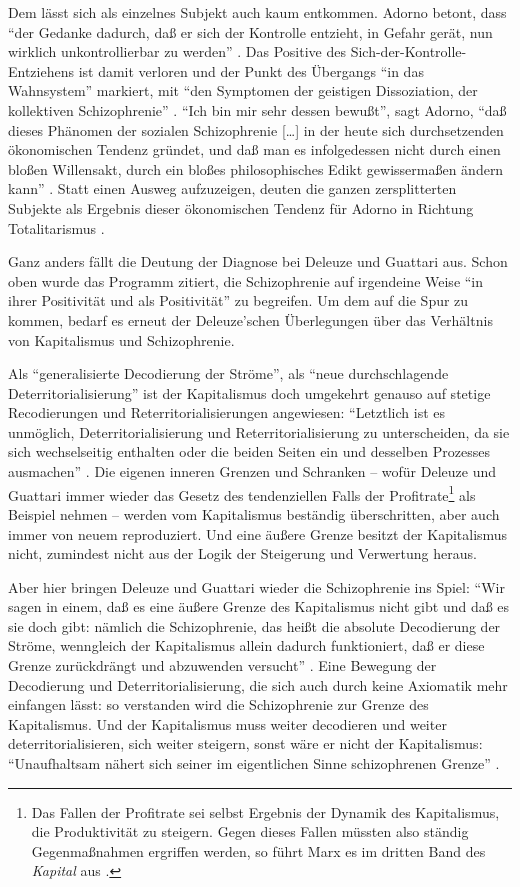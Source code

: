 \documentclass[12pt,
               paper=a4,
               twoside=false,
               onehalfspacing,
               bibliography=totoc,
               toc=graduated,
               ]{scrartcl}
\newcommand{\lips}{\dots\unkern}
\newcommand{\pc}[2]{\parencite[#1]{#2}}
\newcommand{\vgl}[2]{\parencite[vgl.][#1]{#2}}
\newcommand{\dg}{Deleuze und Guattari\xspace}
\begin{document}
Dem lässt sich als einzelnes Subjekt auch kaum entkommen. Adorno
betont, dass "`der Gedanke dadurch, daß er sich der Kontrolle
entzieht, in Gefahr gerät, nun wirklich unkontrollierbar zu werden"'
\pc{229}{vla}. Das Positive des Sich-der-Kontrolle-Entziehens ist
damit verloren und der Punkt des Übergangs "`in das
Wahnsystem"' \pc{229}{vla} markiert, mit "`den Symptomen der geistigen
Dissoziation, der kollektiven Schizophrenie"' \pc{229}{vla}. "`Ich bin
mir sehr dessen bewußt"', sagt Adorno, "`daß dieses Phänomen der
sozialen Schizophrenie [\lips] in der heute sich durchsetzenden
ökonomischen Tendenz gründet, und daß man es infolgedessen nicht durch
einen bloßen Willensakt, durch ein bloßes philosophisches Edikt
gewissermaßen ändern kann"' \pc{274}{vla}. Statt einen Ausweg
aufzuzeigen, deuten die ganzen zersplitterten Subjekte als Ergebnis
dieser ökonomischen Tendenz für Adorno in Richtung Totalitarismus
\vgl{263}{min}.

Ganz anders fällt die Deutung der Diagnose bei \dg aus. Schon oben
wurde das Programm zitiert, die Schizophrenie auf irgendeine Weise
"`in ihrer Positivität und als Positivität"' \pc{24}{schizg} zu
begreifen. Um dem auf die Spur zu kommen, bedarf es erneut der
Deleuze'schen Überlegungen über das Verhältnis von Kapitalismus und
Schizophrenie.

Als "`generalisierte Decodierung der Ströme"', als "`neue
durchschlagende Deterritorialisierung"' \pc{288}{ao} ist der
Kapitalismus doch umgekehrt genauso auf stetige Recodierungen und
Reterritorialisierungen angewiesen: "`Letztlich ist es unmöglich,
Deterritorialisierung und Reterritorialisierung zu unterscheiden, da
sie sich wechselseitig enthalten oder die beiden Seiten ein und
desselben Prozesses ausmachen"' \pc{333}{ao}. Die eigenen inneren
Grenzen und Schranken -- wofür \dg immer wieder das Gesetz des
tendenziellen Falls der Profitrate\footnote{Das Fallen der Profitrate
sei selbst Ergebnis der Dynamik des Kapitalismus, die Produktivität zu
steigern. Gegen dieses Fallen müssten also ständig Gegenmaßnahmen
ergriffen werden, so führt Marx es im dritten Band des \emph{Kapital}
aus \vgl{221-277}{kap3}.} als Beispiel nehmen \vgl{S. 334 f.}{ao}
-- werden vom Kapitalismus beständig überschritten, aber auch immer
von neuem reproduziert. Und eine äußere Grenze besitzt der
Kapitalismus nicht, zumindest nicht aus der Logik der Steigerung und
Verwertung heraus.

Aber hier bringen Deleuze und Guattari wieder die Schizophrenie ins
Spiel: "`Wir sagen in einem, daß es eine äußere Grenze des
Kapitalismus nicht gibt und daß es sie doch gibt: nämlich die
Schizophrenie, das heißt die absolute Decodierung der Ströme,
wenngleich der Kapitalismus allein dadurch funktioniert, daß er diese
Grenze zurückdrängt und abzuwenden versucht"' \pc{322}{ao}. Eine
Bewegung der Decodierung und Deterritorialisierung, die sich auch
durch keine Axiomatik mehr einfangen lässt: so verstanden wird die
Schizophrenie zur Grenze des Kapitalismus. Und der Kapitalismus muss
weiter decodieren und weiter deterritorialisieren, sich weiter
steigern, sonst wäre er nicht der Kapitalismus: "`Unaufhaltsam nähert
sich seiner im eigentlichen Sinne schizophrenen Grenze"' \pc{44}{ao}.
\end{document}
